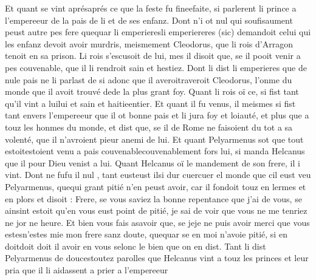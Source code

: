 \documentclass{article}
\begin{document}
\begin{pages}
               Et quant se vint aprésaprés ce que la feste fu 
               fineefaite, 
               si parlerent li prince a l’empereeur de la pais de li et de ses enfanz. 
               Dont n’i ot nul qui soufisaument peust autre pes fere quequar 
               li emperieresli emperiereres 
                  (sic)
               demandoit celui qui les enfanz devoit avoir murdris, 
               meismement Cleodorus, que 
               li rois d’Arragon tenoit en sa prison. 
               Li rois s’escusoit de lui, mes il disoit que, 
               se il pooit venir a pes couvenable, que il li rendroit sain et hestiez. 
               Dont li dist li emperieres que de nule pais ne li parlast de si adonc 
               que il averoitraveroit 
               Cleodorus, l’onme du monde que il avoit trouvé 
               dede la plus grant foy. 
               Quant li rois oï ce, 
               si fist tant qu’il vint a luilui et sain et 
               haitieentier. 
               Et quant il fu venus, il meismes si fist tant envers l’empereeur 
               que il ot bonne pais et li jura foy et loiauté, et plus que a 
               touz les honmes du monde, 
               et dist que, se il de Rome ne faisoient du tot 
                  a sa volenté, que il n’avroient pieur anemi de lui. 
               Et quant Pelyarmenus sot que tout 
               estoitestoient venu a pais 
               couvenablecouvenablement fors lui, 
               si manda Helcanus que il pour Dieu venist a lui. \pend
            \pstart Quant Helcanus oï le mandement de 
               son frere, il i vint. Dont ne 
               fufu il nul , tant 
                  eusteust ilsi dur 
               cuercuer el monde que 
               cil eust veu Pelyarmenus, quequi 
               grant pitié n’en peust avoir, car il fondoit touz en lermes et en plors et disoit :
               Frere, se vous saviez la bonne repentance que j’ai de vous, 
               se ainsint estoit qu’en vous eust point de pitié, 
               je sai de voir que vous ne me tenriez ne jor ne heure. 
               Et bien vous fais asavoir que, se jeje ne puis avoir merci 
                  que vous estesn'estes mie mon frere 
                  sanz doute, 
                  quequar se en moi n’avoie pitié, si en 
                  doitdoit doit il avoir en vous selonc le bien que on 
                  en dist. 
               Tant li dist Pelyarmenus de 
               doucestoutez parolles 
               que Helcanus vint a touz les princes et 
               leur pria que il li aidassent a prier a l’empereeur 

\end{pages}
\end{document}
